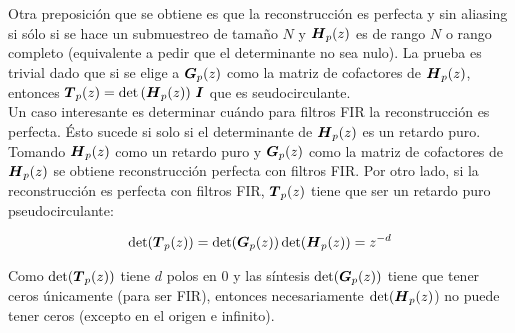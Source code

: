 		Otra preposición que se obtiene es que la reconstrucción es perfecta y sin aliasing si sólo si se hace un submuestreo de tamaño $N$ y $\boldsymbol{H}_p(z)$ es de rango $N$ o rango completo (equivalente a pedir que el determinante no sea nulo). La prueba es trivial dado que si se elige a $\boldsymbol{G}_p(z)$ como la matriz de cofactores de $\boldsymbol{H}_p(z)$, entonces $\boldsymbol{T}_p(z) = \det\left(\boldsymbol{H}_p(z)\right)\,\boldsymbol{I}$ que es seudocirculante.\\

		Un caso interesante es determinar cuándo para filtros FIR la reconstrucción es perfecta. Ésto sucede si solo si el determinante de $\boldsymbol{H}_p(z)$ es un retardo puro.\\
		\indent Tomando $\boldsymbol{H}_p(z)$ como un retardo puro y $\boldsymbol{G}_p(z)$ como la matriz de cofactores de $\boldsymbol{H}_p(z)$ se obtiene reconstrucción perfecta con filtros FIR. Por otro lado, si la reconstrucción es perfecta con filtros FIR, $\boldsymbol{T}_p(z)$ tiene que ser un retardo puro pseudocirculante: 
		
		\begin{equation*}
			\det(\boldsymbol{T}_p(z)) = \det(\boldsymbol{G}_p(z)) \det(\boldsymbol{H}_p(z)) = z^{-d}
		\end{equation*}
		
		Como $\det(\boldsymbol{T}_p(z))$ tiene $d$ polos en 0 y las síntesis $\det(\boldsymbol{G}_p(z))$ tiene que tener ceros únicamente (para ser FIR), entonces necesariamente $\det(\boldsymbol{H}_p(z)$) no puede tener ceros (excepto en el origen e infinito).\\






